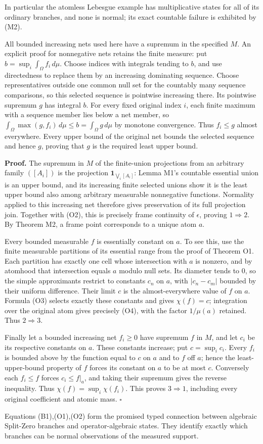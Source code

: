 In particular the atomless Lebesgue example has multiplicative states for all of its ordinary branches, and none is normal; its exact countable failure is exhibited by (M2).

All bounded increasing nets used here have a supremum in the specified \(M\). An explicit proof for nonnegative nets retains the finite measure: put \(b=\sup_i\int_\Omega f_i\,d\mu\). Choose indices with integrals tending to \(b\), and use directedness to replace them by an increasing dominating sequence. Choose representatives outside one common null set for the countably many sequence comparisons, so this selected sequence is pointwise increasing there. Its pointwise supremum \(g\) has integral \(b\). For every fixed original index \(i\), each finite maximum with a sequence member lies below a net member, so \(\int_\Omega\max(g,f_i)\,d\mu\le b=\int_\Omega g\,d\mu\) by monotone convergence. Thus \(f_i\le g\) almost everywhere. Every upper bound of the original net bounds the selected sequence and hence \(g\), proving that \(g\) is the required least upper bound.

\textbf{Proof.} The supremum in \(M\) of the finite-union projections from an arbitrary family \(([A_i])\) is the projection \(\mathbf1_{\bigvee_i[A_i]}\): Lemma M1's countable essential union is an upper bound, and its increasing finite selected unions show it is the least upper bound also among arbitrary measurable nonnegative functions. Normality applied to this increasing net therefore gives preservation of its full projection join. Together with (O2), this is precisely frame continuity of \(\epsilon\), proving \(1\Rightarrow2\). By Theorem M2, a frame point corresponds to a unique atom \(a\).

Every bounded measurable \(f\) is essentially constant on \(a\). To see this, use the finite measurable partitions of its essential range from the proof of Theorem O1. Each partition has exactly one cell whose intersection with \(a\) is nonzero, and by atomhood that intersection equals \(a\) modulo null sets. Its diameter tends to \(0\), so the simple approximants restrict to constants \(c_n\) on \(a\), with \(|c_n-c_m|\) bounded by their uniform difference. Their limit \(c\) is the almost-everywhere value of \(f\) on \(a\). Formula (O3) selects exactly these constants and gives \(\chi (f)=c\); integration over the original atom gives precisely (O4), with the factor \(1/\mu (a)\) retained. Thus \(2\Rightarrow3\).

Finally let a bounded increasing net \(f_i\ge 0\) have supremum \(f\) in \(M\), and let \(c_i\) be its respective constants on \(a\). These constants increase; put \(c=\sup_i c_i\). Every \(f_i\) is bounded above by the function equal to \(c\) on \(a\) and to \(f\) off \(a\); hence the least-upper-bound property of \(f\) forces its constant on \(a\) to be at most \(c\). Conversely each \(f_i\le f\) forces \(c_i\le f|_a\), and taking their supremum gives the reverse inequality. Thus \(\chi(f)=\sup_i\chi(f_i)\). This proves \(3\Rightarrow1\), including every original coefficient and atomic mass. \(\square\)

Equations (B1),(O1),(O2) form the promised typed connection between algebraic Split-Zero branches and operator-algebraic states. They identify exactly which branches can be normal observations of the measured support.
